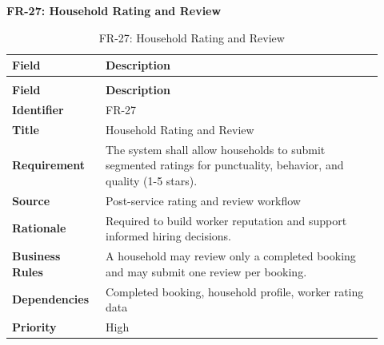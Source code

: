 \documentclass[12pt,a4paper]{article}
\begin{document}
\noindent\textbf{FR-27: Household Rating and Review}\par
\vspace{4pt}
\begingroup\small\setlength{\tabcolsep}{4pt}\renewcommand{\arraystretch}{1.15}
\begin{longtable}{|>{\raggedright\arraybackslash}p{0.22\linewidth}|>{\raggedright\arraybackslash}p{0.70\linewidth}|}
\caption{FR-27: Household Rating and Review}\label{tab:fr-27}\\
\hline
\textbf{Field} & \textbf{Description} \\ \hline
\endfirsthead
\multicolumn{2}{c}{Table \thetable\ Household Rating and Review (continued)}\\
\hline
\textbf{Field} & \textbf{Description} \\ \hline
\endhead
\textbf{Identifier} & FR-27 \\ \hline
\textbf{Title} & Household Rating and Review \\ \hline
\textbf{Requirement} & The system shall allow households to submit segmented ratings for punctuality, behavior, and quality (1-5 stars). \\ \hline
\textbf{Source} & Post-service rating and review workflow \\ \hline
\textbf{Rationale} & Required to build worker reputation and support informed hiring decisions. \\ \hline
\textbf{Business Rules} & A household may review only a completed booking and may submit one review per booking. \\ \hline
\textbf{Dependencies} & Completed booking, household profile, worker rating data \\ \hline
\textbf{Priority} & High \\ \hline
\end{longtable}
\endgroup
\end{document}
